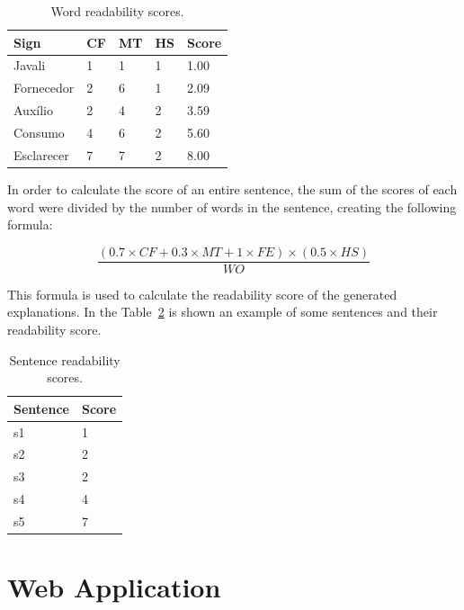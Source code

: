 \begin{table}[H]
    \centering
    \caption{Word readability scores.}
    \label{table:signs}
    \begin{tabular}{l|l|l|l|l}
        {\bfseries Sign} & {\bfseries CF} & {\bfseries MT} & {\bfseries HS} & {\bfseries Score} \\
        \hline
        Javali & 1 & 1 & 1 & 1.00  \\
        \hline
        Fornecedor & 2 & 6 & 1 & 2.09  \\
        \hline
        Auxílio & 2 & 4 & 2 & 3.59 \\
        \hline
        Consumo & 4 & 6 & 2 & 5.60 \\
        \hline
        Esclarecer & 7 & 7 & 2 & 8.00 \\
    \end{tabular}
\end{table}

In order to calculate the score of an entire sentence, the sum of the scores of each word were divided by the number of words in the sentence, creating the following formula:

\begin{equation}
    \frac{(0.7 \times CF + 0.3 \times MT + 1 \times FE) \times (0.5 \times HS)}{WO}
\label{sentenceScore}
\end{equation}

This formula is used to calculate the readability score of the generated explanations.
In the Table~\ref{table:sentences} is shown an example of some sentences and their readability score.

\begin{table}[H]
    \centering
    \caption{Sentence readability scores.}
    \label{table:sentences}
    \begin{tabular}{l|l}
        {\bfseries Sentence} & {\bfseries Score} \\
        \hline
        s1 & 1  \\
        \hline
        s2 & 2  \\
        \hline
        s3 & 2 \\
        \hline
        s4 & 4 \\
        \hline
        s5 & 7 \\
    \end{tabular}
\end{table}

\section{Web Application}

